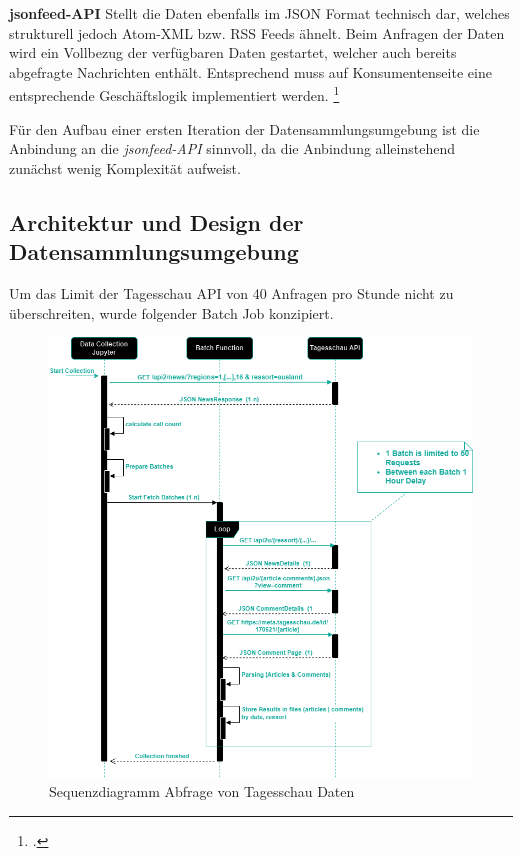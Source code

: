 \textbf{jsonfeed-API}
Stellt die Daten ebenfalls im JSON Format technisch dar, welches strukturell jedoch Atom-XML bzw. RSS Feeds ähnelt. Beim Anfragen der Daten wird ein Vollbezug der verfügbaren Daten gestartet, welcher auch bereits abgefragte Nachrichten enthält. Entsprechend muss auf Konsumentenseite eine entsprechende Geschäftslogik implementiert werden. \footcite[Vgl.][]{DpaApiDocumentation.APIs.2024}

Für den Aufbau einer ersten Iteration der Datensammlungsumgebung ist die Anbindung an die \textit{jsonfeed-API} sinnvoll, da die Anbindung alleinstehend zunächst wenig Komplexität aufweist. 



\newpage
\subsection{Architektur und Design der Datensammlungsumgebung}

Um das Limit der Tagesschau API von 40 Anfragen pro Stunde nicht zu überschreiten, wurde folgender Batch Job konzipiert. 

\begin{figure}
    \centering
    \includegraphics[width=1\linewidth]{abbildungen/image.png}
    \caption{Sequenzdiagramm Abfrage von Tagesschau Daten}
    \label{fig:Sequenzdiagramm Abfrage von Tagesschau Daten}
\end{figure}